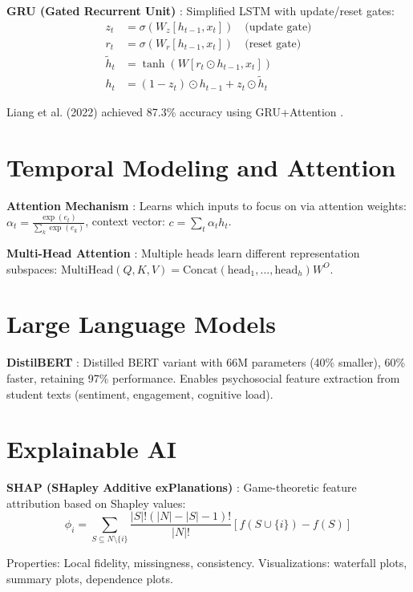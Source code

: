 \textbf{GRU (Gated Recurrent Unit)} \cite{cho2014learning}: Simplified LSTM with update/reset gates:
\begin{align}
z_t &= \sigma(W_z [h_{t-1}, x_t]) \quad \text{(update gate)} \\
r_t &= \sigma(W_r [h_{t-1}, x_t]) \quad \text{(reset gate)} \\
\tilde{h}_t &= \tanh(W [r_t \odot h_{t-1}, x_t]) \\
h_t &= (1 - z_t) \odot h_{t-1} + z_t \odot \tilde{h}_t
\end{align}

Liang et al. (2022) achieved 87.3\% accuracy using GRU+Attention \cite{liang2022student}.

\section{Temporal Modeling and Attention}

\textbf{Attention Mechanism} \cite{bahdanau2015neural}: Learns which inputs to focus on via attention weights: $\alpha_t = \frac{\exp(e_t)}{\sum_{k} \exp(e_k)}$, context vector: $c = \sum_t \alpha_t h_t$.

\textbf{Multi-Head Attention} \cite{vaswani2017attention}: Multiple heads learn different representation subspaces: $\text{MultiHead}(Q,K,V) = \text{Concat}(\text{head}_1, ..., \text{head}_h)W^O$.

\section{Large Language Models}

\textbf{DistilBERT} \cite{sanh2019distilbert}: Distilled BERT variant with 66M parameters (40\% smaller), 60\% faster, retaining 97\% performance. Enables psychosocial feature extraction from student texts (sentiment, engagement, cognitive load).

\section{Explainable AI}

\textbf{SHAP (SHapley Additive exPlanations)} \cite{lundberg2017unified}: Game-theoretic feature attribution based on Shapley values:
$$\phi_i = \sum_{S \subseteq N \setminus \{i\}} \frac{|S|!(|N|-|S|-1)!}{|N|!}[f(S \cup \{i\}) - f(S)]$$

Properties: Local fidelity, missingness, consistency. Visualizations: waterfall plots, summary plots, dependence plots.

